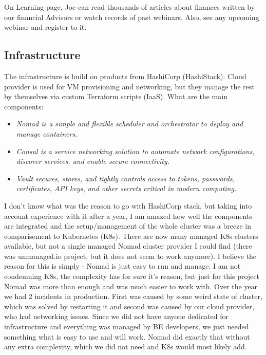 \begin{example}[Education]
    On Learning page, Joe can read thousands of articles about finances written by our financial Advisors or watch records of past webinars. Also, see any upcoming webinar and register to it.
\end{example}



\subsection{Infrastructure}
The infrastructure is build on products from HashiCorp (HashiStack). Cloud provider is used for VM provisioning and networking, but they manage the rest by themselves via custom Terraform scripts (IaaS). What are the main components:
\begin{itemize}
    \item \it{Nomad}  is a simple and flexible scheduler and orchestrator to deploy and manage containers. \cite{NOMAD}
    \item \it{Consul} is a service networking solution to automate network configurations, discover services, and enable secure connectivity. \cite{CONSUL}
    \item \it{Vault} secures, stores, and tightly controls access to tokens, passwords, certificates, API keys, and other secrets critical in modern computing. \cite{VAULT}
\end{itemize}

I don't know what was the reason to go with HashiCorp stack, but taking into account experience with it after a year, I am amazed how well the components are integrated and the setup/management of the whole cluster was a breeze in comparisement to Kubernetes (K8s). There are now many managed K8s clusters available, but not a single managed Nomad cluster provider I could find (there was unmanaged.io project, but it does not seem to work anymore). I believe the reason for this is simply - Nomad is just easy to run and manage. I am not condemning K8s, the complexity has for sure it's reason, but just for this project Nomad was more than enough and was much easier to work with. Over the year we had 2 incidents in production. First was caused by some weird state of cluster, which was solved by restarting it and second was caused by our cloud provider, who had networking issues. Since we did not have anyone dedicated for infrastructure and everything was managed by BE developers, we just needed something what is easy to use and will work. Nomad did exactly that without any extra complexity, which we did not need and K8s would most likely add.


